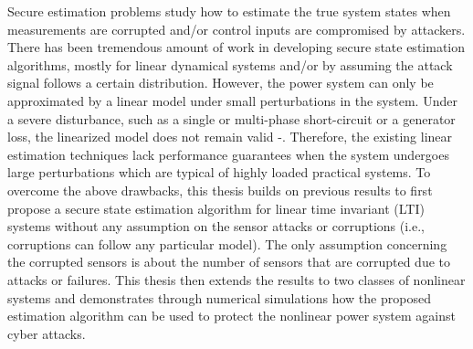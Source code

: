 \documentclass[../thesis.tex]{subfiles}
\begin{document}
Secure estimation problems study how to estimate the true system states when measurements are corrupted and/or control inputs are compromised by attackers.
There has been tremendous amount of work in developing secure state estimation algorithms, mostly for linear dynamical systems and/or by assuming the attack signal follows a certain distribution.
However, the power system can only be approximated by a linear model under small perturbations in the system. 
Under a severe disturbance, such as a single or multi-phase short-circuit or a generator loss, the linearized model does not remain valid \cite{Kundur}-\!\!\cite{nonlin_est}. 
Therefore, the existing linear estimation techniques lack performance guarantees when the system undergoes large perturbations which are typical of highly loaded practical systems. 
To overcome the above drawbacks, this thesis builds on previous results to first propose a secure state estimation algorithm for linear time invariant (LTI) systems without any assumption on the sensor attacks or corruptions (i.e., corruptions can follow any particular model).
The only assumption concerning the corrupted sensors is about the number of sensors that are corrupted due to attacks or failures. 
This thesis then extends the results to two classes of nonlinear systems and demonstrates through numerical simulations how the proposed estimation algorithm can be used to protect the nonlinear power system against cyber attacks.
\end{document}
